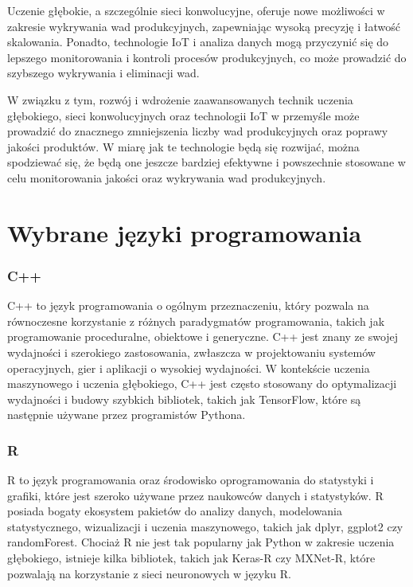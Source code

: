 Uczenie głębokie, a szczególnie sieci konwolucyjne, oferuje nowe możliwości w zakresie wykrywania wad produkcyjnych, zapewniając wysoką precyzję i łatwość skalowania. Ponadto, technologie IoT i analiza danych mogą przyczynić się do lepszego monitorowania i kontroli procesów produkcyjnych, co może prowadzić do szybszego wykrywania i eliminacji wad.

W związku z tym, rozwój i wdrożenie zaawansowanych technik uczenia głębokiego, sieci konwolucyjnych oraz technologii IoT w przemyśle może prowadzić do znacznego zmniejszenia liczby wad produkcyjnych oraz poprawy jakości produktów. W miarę jak te technologie będą się rozwijać, można spodziewać się, że będą one jeszcze bardziej efektywne i powszechnie stosowane w celu monitorowania jakości oraz wykrywania wad produkcyjnych.

\section{Wybrane języki programowania}
\subsubsection{C++}
C++ to język programowania o ogólnym przeznaczeniu, który pozwala na równoczesne korzystanie z różnych paradygmatów programowania, takich jak programowanie proceduralne, obiektowe i generyczne. C++ jest znany ze swojej wydajności i szerokiego zastosowania, zwłaszcza w projektowaniu systemów operacyjnych, gier i aplikacji o wysokiej wydajności. W kontekście uczenia maszynowego i uczenia głębokiego, C++ jest często stosowany do optymalizacji wydajności i budowy szybkich bibliotek, takich jak TensorFlow, które są następnie używane przez programistów Pythona.

\subsubsection{R}
R to język programowania oraz środowisko oprogramowania do statystyki i grafiki, które jest szeroko używane przez naukowców danych i statystyków. R posiada bogaty ekosystem pakietów do analizy danych, modelowania statystycznego, wizualizacji i uczenia maszynowego, takich jak dplyr, ggplot2 czy randomForest. Chociaż R nie jest tak popularny jak Python w zakresie uczenia głębokiego, istnieje kilka bibliotek, takich jak Keras-R czy MXNet-R, które pozwalają na korzystanie z sieci neuronowych w języku R.

